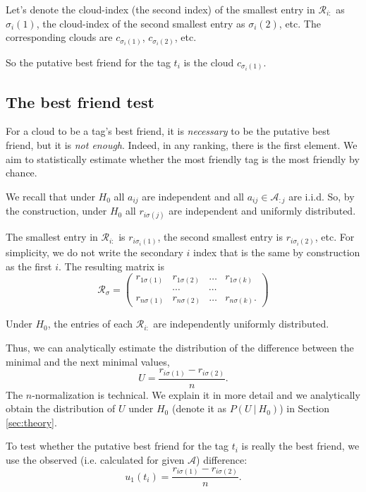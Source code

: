 \documentclass{llncs}
\begin{document}
Let's denote the cloud-index (the second index) of the smallest entry in $\mathcal{R}_{i:}$ as $\sigma_i(1)$, the cloud-index of the second smallest entry as ${\sigma_i(2)}$, etc. The corresponding clouds are $c_{\sigma_{i}(1)}$, $c_{\sigma_{i}(2)}$, etc. 

So the putative best friend for the tag $t_i$ is the cloud $c_{\sigma_{i}(1)}$.

\subsection{The best friend test}
\label{sec:best_friend_test}

For a cloud to be a tag's best friend, it is \textit{necessary} to be the putative best friend, but it is \textit{not enough}. Indeed, in any ranking, there is the first element. We aim to statistically estimate whether the most friendly tag is the most friendly by chance. 

We recall that under $H_0$ all $a_{ij}$ are independent and all $a_{ij} \in \mathcal{A}_{:j}$ are i.i.d. So, by the construction, under $H_0$ all $r_{i\sigma(j)}$ are independent and uniformly distributed.

The smallest entry in $\mathcal{R}_{i:}$ is $r_{i\sigma_i(1)}$, the second smallest entry is $r_{i\sigma_i(2)}$, etc. For simplicity, we do not write the secondary $i$ index that is the same by construction as the first $i$. The resulting matrix is 
\[
\mathcal{R}_{\sigma} = \begin{pmatrix}
r_{1\sigma(1)} & r_{1\sigma(2)} & \dots & r_{1\sigma(k)} \\
       &\cdots & \cdots &  \\
r_{n\sigma(1)} & r_{n\sigma(2)} & \dots & r_{n\sigma(k)}.
\end{pmatrix}
\]

Under $H_0$, the entries of each $\mathcal{R}_{i:}$ are independently uniformly distributed. 

Thus, we can analytically estimate the distribution of the difference between the minimal and the next minimal values,
\[
U = \frac{r_{i\sigma(1)} - r_{i\sigma(2)}}{n}. 
\]
The $n$-normalization is technical. We explain it in more detail and we analytically obtain the distribution of $U$ under $H_0$ (denote it as $P(U ~|~ H_0)$) in Section \ref{sec:theory}. 

To test whether the putative best friend for the tag $t_i$ is really the best friend, we use the observed  (i.e. calculated for given $\mathcal{A}$) difference:
\[
u_1(t_i) = \frac{r_{i\sigma(1)} -  r_{i\sigma(2)}}{n}.
\] 
\end{document}
